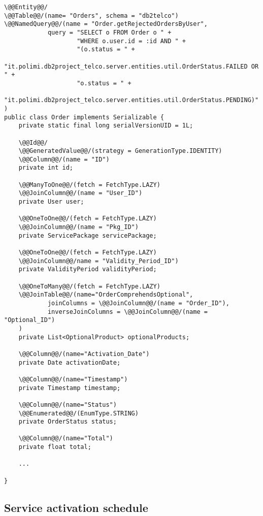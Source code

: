 \begin{lstlisting}[style = JPA]
\@@Entity@@/
\@@Table@@/(name= "Orders", schema = "db2telco")
\@@NamedQuery@@/(name = "Order.getRejectedOrdersByUser", 
            query = "SELECT o FROM Order o " +
                    "WHERE o.user.id = :id AND " +
                    "(o.status = " +
    "it.polimi.db2project_telco.server.entities.util.OrderStatus.FAILED OR " +
                    "o.status = " +
    "it.polimi.db2project_telco.server.entities.util.OrderStatus.PENDING)"
)
public class Order implements Serializable {
    private static final long serialVersionUID = 1L;

    \@@Id@@/
    \@@GeneratedValue@@/(strategy = GenerationType.IDENTITY)
    \@@Column@@/(name = "ID")
    private int id;

    \@@ManyToOne@@/(fetch = FetchType.LAZY)
    \@@JoinColumn@@/(name = "User_ID")
    private User user;

    \@@OneToOne@@/(fetch = FetchType.LAZY)
    \@@JoinColumn@@/(name = "Pkg_ID")
    private ServicePackage servicePackage;

    \@@OneToOne@@/(fetch = FetchType.LAZY)
    \@@JoinColumn@@/name = "Validity_Period_ID")
    private ValidityPeriod validityPeriod;

    \@@OneToMany@@/(fetch = FetchType.LAZY)
    \@@JoinTable@@/(name="OrderComprehendsOptional",
            joinColumns = \@@JoinColumn@@/(name = "Order_ID"),
            inverseJoinColumns = \@@JoinColumn@@/(name = "Optional_ID")
    )
    private List<OptionalProduct> optionalProducts;

    \@@Column@@/(name="Activation_Date")
    private Date activationDate;

    \@@Column@@/(name="Timestamp")
    private Timestamp timestamp;

    \@@Column@@/(name="Status")
    \@@Enumerated@@/(EnumType.STRING)
    private OrderStatus status;

    \@@Column@@/(name="Total")
    private float total;
    
    ...

}
\end{lstlisting}

\subsection*{Service activation schedule}

